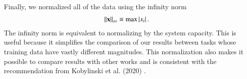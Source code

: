 Finally, we normalized all of the data using the infinity norm
\begin{align}
  \left\lVert\mathbf{x}\right\rVert_\infty \equiv \text{max}\left|x_i\right|.
\end{align}
The infinity norm is equivalent to normalizing by the system capacity. This is
useful because it simplifies the comparison of our results between
tasks whose training data have vastly different magnitudes. This normalization
also makes it possible to compare results with other works and is consistent
with the recommendation from Kobylinski et al. (2020) \cite{kobylinski_high-resolution_2020}.
